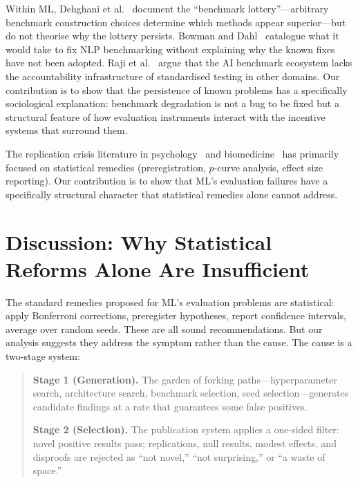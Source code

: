 \documentclass{article}
\begin{document}
Within ML, Dehghani et al.~\citep{dehghani_benchmark_2021} document the ``benchmark lottery''---arbitrary benchmark construction choices determine which methods appear superior---but do not theorise why the lottery persists. Bowman and Dahl~\citep{bowman_what_2021} catalogue what it would take to fix NLP benchmarking without explaining why the known fixes have not been adopted. Raji et al.~\citep{raji_ai_2021} argue that the AI benchmark ecosystem lacks the accountability infrastructure of standardised testing in other domains. Our contribution is to show that the persistence of known problems has a specifically sociological explanation: benchmark degradation is not a bug to be fixed but a structural feature of how evaluation instruments interact with the incentive systems that surround them.

The replication crisis literature in psychology~\citep{nosek_replication_2015} and biomedicine~\citep{ioannidis_2005} has primarily focused on statistical remedies (preregistration, $p$-curve analysis, effect size reporting). Our contribution is to show that ML's evaluation failures have a specifically structural character that statistical remedies alone cannot address.

\section{Discussion: Why Statistical Reforms Alone Are Insufficient}
\label{sec:discussion}

The standard remedies proposed for ML's evaluation problems are statistical: apply Bonferroni corrections, preregister hypotheses, report confidence intervals, average over random seeds. These are all sound recommendations. But our analysis suggests they address the symptom rather than the cause. The cause is a two-stage system:

\begin{quote}
\textbf{Stage 1 (Generation).} The garden of forking paths---hyperparameter search, architecture search, benchmark selection, seed selection---generates candidate findings at a rate that guarantees some false positives.

\textbf{Stage 2 (Selection).} The publication system applies a one-sided filter: novel positive results pass; replications, null results, modest effects, and disproofs are rejected as ``not novel,'' ``not surprising,'' or ``a waste of space.''
\end{quote}
\end{document}
